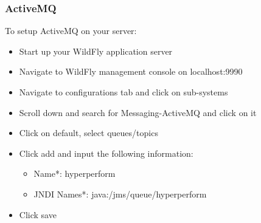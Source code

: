 \documentclass[11pt,a4paper]{article}
\begin{document}
\subsubsection{ActiveMQ}
To setup ActiveMQ on your server: \\
\begin{itemize}
	\item Start up your WildFly application server
	\item Navigate to WildFly management console on localhost:9990
	\item Navigate to configurations tab and click on sub-systems
	\item Scroll down and search for Messaging-ActiveMQ and click on it
	\item Click on default, select queues/topics
	\item Click add and input the following information:
		\begin{itemize}
			\item Name*: hyperperform
			\item JNDI Names*: java:/jms/queue/hyperperform
		\end{itemize}
	\item Click save \\
\end{itemize}
\end{document}
